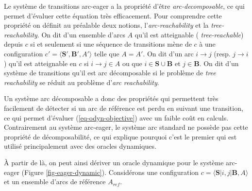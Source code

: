 \documentclass[11pt,openany]{book}
\begin{document}
Le système de transitions arc-eager a la propriété d'être
{\sl arc-decomposable}, ce qui permet d'évaluer cette équation très
efficacement. Pour comprendre cette propriété on définit au préalable deux notions,
l'{\sl arc-reachability} et la {\sl tree-reachability}.
On dit d'un ensemble d'arcs $A$ qu'il est atteignable ({\sl
  tree-reachable}) depuis $c$ si et
seulement si une séquence de transitions mène de $c$ à une
configuration $c' = \langle \mathbf{S}',\mathbf{B}',A'\rangle$
telle que $A= A'$. 
On dit d'un arc $i \rightarrow j$ (resp. $j\rightarrow i$) qu'il est atteignable en $c$ si 
$i \rightarrow j \in A$ ou que $i \in \mathbf{S} \cup \mathbf{B}$
et $j \in \mathbf{B}$.
On dit d'un système de transitions qu'il est arc décomposable si le
problème de {\sl tree reachability} se réduit au problème d'{\sl arc reachability}.

Un système arc décomposable a donc des propriétés qui permettent très
facilement de détecter si un arc de référence est perdu en suivant une
transition, 
ce qui permet d'évaluer (\ref{eq-odyn-objective}) avec un faible coût
en calculs. Contrairement au système arc-eager, le système arc
standard ne possède
pas cette propriété de décomposabilité, ce qui explique pourquoi c'est
le premier qui est utilisé principalement avec des oracles dynamiques.

\`A partir de là, on peut ainsi dériver un oracle dynamique pour le
système arc-eager (Figure \ref{fig-eager-dynamic}). Considérons une configuration  $c = \langle
\mathbf{S}|i, j|\mathbf{B},A\rangle$ et un ensemble d'arcs de
référence $A_{ref}$. 
\end{document}
